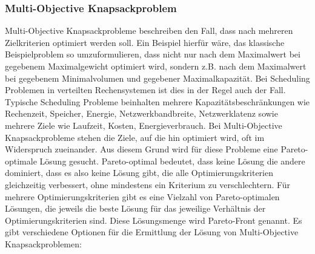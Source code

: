 \subsubsection{Multi-Objective Knapsackproblem}

Multi-Objective Knapsackprobleme beschreiben den Fall, dass nach mehreren Zielkriterien optimiert werden soll. Ein Beispiel hierfür wäre, das klassische Beispielproblem so umzuformulieren, dass nicht nur nach dem Maximalwert bei gegebenem Maximalgewicht optimiert wird, sondern z.B. nach dem Maximalwert bei gegebenem Minimalvolumen und gegebener Maximalkapazität. Bei Scheduling Problemen in verteilten Rechensystemen ist dies in der Regel auch der Fall. Typische Scheduling Probleme beinhalten mehrere Kapazitätsbeschränkungen wie Rechenzeit, Speicher, Energie, Netzwerkbandbreite, Netzwerklatenz sowie mehrere Ziele wie Laufzeit, Kosten, Energieverbrauch. Bei Multi-Objective Knapsackprobleme stehen die Ziele, auf die hin optimiert wird, oft im Widerspruch zueinander. Aus diesem Grund wird für diese Probleme eine Pareto-optimale Lösung gesucht. Pareto-optimal bedeutet, dass keine Lösung die andere dominiert, dass es also keine Lösung gibt, die alle Optimierungskriterien gleichzeitig verbessert, ohne mindestens ein Kriterium zu verschlechtern. Für mehrere Optimierungskriterien gibt es eine Vielzahl von Pareto-optimalen Lösungen, die jeweils die beste Lösung für das jeweilige Verhältnis der Optimierungskriterien sind. Diese Lösungsmenge wird Pareto-Front genannt. Es gibt verschiedene Optionen für die Ermittlung der Lösung von Multi-Objective Knapsackproblemen:

